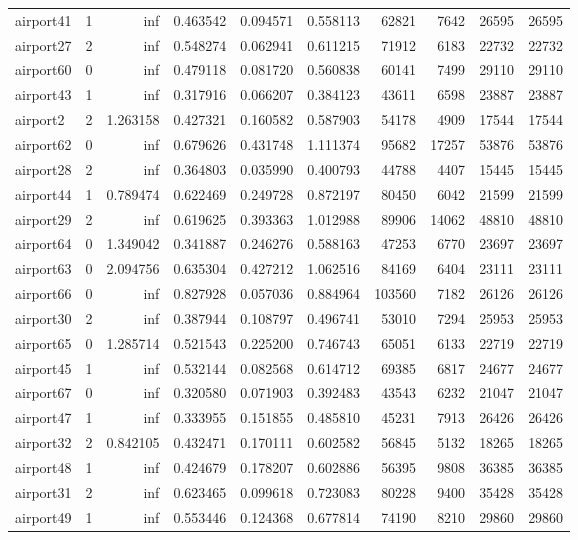 \documentclass[../../../thesis.tex]{subfiles}
\begin{document}
\begin{longtable}{|l|r|r|r|r|r|r|r|r|r|}
airport41 & 1 & inf & 0.463542 & 0.094571 & 0.558113 & 62821 & 7642 & 26595 & 26595 \\
airport27 & 2 & inf & 0.548274 & 0.062941 & 0.611215 & 71912 & 6183 & 22732 & 22732 \\
airport60 & 0 & inf & 0.479118 & 0.081720 & 0.560838 & 60141 & 7499 & 29110 & 29110 \\
airport43 & 1 & inf & 0.317916 & 0.066207 & 0.384123 & 43611 & 6598 & 23887 & 23887 \\
airport2 & 2 & 1.263158 & 0.427321 & 0.160582 & 0.587903 & 54178 & 4909 & 17544 & 17544 \\
airport62 & 0 & inf & 0.679626 & 0.431748 & 1.111374 & 95682 & 17257 & 53876 & 53876 \\
airport28 & 2 & inf & 0.364803 & 0.035990 & 0.400793 & 44788 & 4407 & 15445 & 15445 \\
airport44 & 1 & 0.789474 & 0.622469 & 0.249728 & 0.872197 & 80450 & 6042 & 21599 & 21599 \\
airport29 & 2 & inf & 0.619625 & 0.393363 & 1.012988 & 89906 & 14062 & 48810 & 48810 \\
airport64 & 0 & 1.349042 & 0.341887 & 0.246276 & 0.588163 & 47253 & 6770 & 23697 & 23697 \\
airport63 & 0 & 2.094756 & 0.635304 & 0.427212 & 1.062516 & 84169 & 6404 & 23111 & 23111 \\
airport66 & 0 & inf & 0.827928 & 0.057036 & 0.884964 & 103560 & 7182 & 26126 & 26126 \\
airport30 & 2 & inf & 0.387944 & 0.108797 & 0.496741 & 53010 & 7294 & 25953 & 25953 \\
airport65 & 0 & 1.285714 & 0.521543 & 0.225200 & 0.746743 & 65051 & 6133 & 22719 & 22719 \\
airport45 & 1 & inf & 0.532144 & 0.082568 & 0.614712 & 69385 & 6817 & 24677 & 24677 \\
airport67 & 0 & inf & 0.320580 & 0.071903 & 0.392483 & 43543 & 6232 & 21047 & 21047 \\
airport47 & 1 & inf & 0.333955 & 0.151855 & 0.485810 & 45231 & 7913 & 26426 & 26426 \\
airport32 & 2 & 0.842105 & 0.432471 & 0.170111 & 0.602582 & 56845 & 5132 & 18265 & 18265 \\
airport48 & 1 & inf & 0.424679 & 0.178207 & 0.602886 & 56395 & 9808 & 36385 & 36385 \\
airport31 & 2 & inf & 0.623465 & 0.099618 & 0.723083 & 80228 & 9400 & 35428 & 35428 \\
airport49 & 1 & inf & 0.553446 & 0.124368 & 0.677814 & 74190 & 8210 & 29860 & 29860 \\

\end{longtable}
\end{document}

